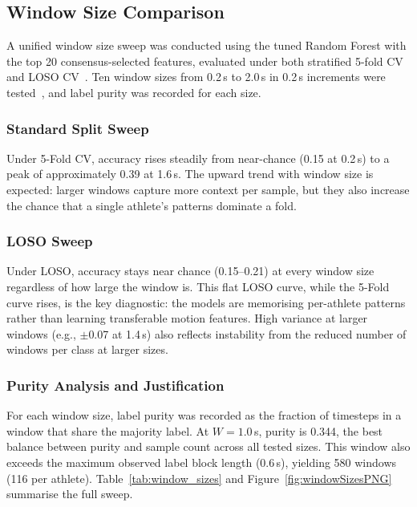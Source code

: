 \documentclass[12pt,a4paper]{cibb}
\begin{document}
\subsection{Window Size Comparison}

A unified window size sweep was conducted using the tuned Random Forest with the top 20 consensus-selected features, evaluated under both stratified 5-fold CV and LOSO CV~\cite{10962074}. Ten window sizes from 0.2\,s to 2.0\,s in 0.2\,s increments were tested~\cite{10689691}, and label purity was recorded for each size.

\subsubsection{Standard Split Sweep}
Under 5-Fold CV, accuracy rises steadily from near-chance (0.15 at 0.2\,s) to a peak of approximately 0.39 at 1.6\,s. The upward trend with window size is expected: larger windows capture more context per sample, but they also increase the chance that a single athlete's patterns dominate a fold.

\subsubsection{LOSO Sweep}
Under LOSO, accuracy stays near chance (0.15--0.21) at every window size regardless of how large the window is. This flat LOSO curve, while the 5-Fold curve rises, is the key diagnostic: the models are memorising per-athlete patterns rather than learning transferable motion features. High variance at larger windows (e.g., $\pm$0.07 at 1.4\,s) also reflects instability from the reduced number of windows per class at larger sizes.

\subsubsection{Purity Analysis and Justification}
For each window size, label purity was recorded as the fraction of timesteps in a window that share the majority label. At $W = 1.0$\,s, purity is 0.344, the best balance between purity and sample count across all tested sizes. This window also exceeds the maximum observed label block length (0.6\,s), yielding 580 windows (116 per athlete). Table~\ref{tab:window_sizes} and Figure~\ref{fig:windowSizesPNG} summarise the full sweep.

\begin{table}[H]
\centering
{}
\caption{Accuracy and label purity across window sizes (tuned Random Forest).}
\label{tab:window_sizes}
\end{table}
\end{document}
